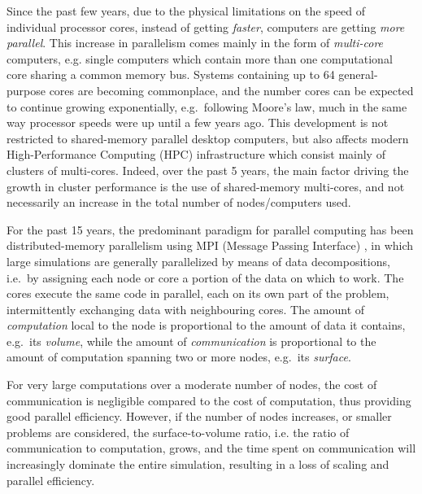 \documentclass[final]{siamltex}
\begin{document}
Since the past few years, due to the physical limitations
on the speed of individual processor cores, instead of
getting {\em faster}, computers are getting {\em more parallel}.
This increase in parallelism comes mainly in the form of
{\em multi-core} computers, e.g. single computers which
contain more than one computational core sharing a common 
memory bus.
Systems containing up to 64 general-purpose cores are becoming
commonplace, and the number cores can be expected to continue
growing exponentially, e.g.~following Moore's law, much in the
same way processor speeds were up until a few years ago.
This development is not restricted to shared-memory parallel desktop
computers, but also affects modern High-Performance Computing (HPC)
infrastructure which consist mainly of clusters of multi-cores.
Indeed, over the past 5 years, the main factor driving the growth
in cluster performance is the use of shared-memory multi-cores,
and not necessarily an increase in the total number of
nodes/computers used.

For the past 15 years, the predominant paradigm for parallel
computing has been distributed-memory parallelism using MPI
(Message Passing Interface) \cite{ref:Snir1998},
in which large simulations are generally
parallelized by means of data decompositions, i.e.~by assigning
each node or core a portion of the data on which to work.
The cores execute the same code
in parallel, each on its own part of the problem, intermittently exchanging
data with neighbouring cores.
The amount of {\em computation} local to the node is proportional
to the amount of data it contains, e.g.~its {\em volume}, while
the amount of {\em communication} is proportional to the
amount of computation spanning two or more nodes, e.g.~its
{\em surface}.

For very large computations over a moderate number of nodes,
the cost of communication is negligible compared to the
cost of computation, thus providing good parallel efficiency.
However, if the number of nodes increases, or 
smaller problems are considered, the surface-to-volume ratio,
i.e. the ratio of communication to computation,
grows, and the time spent on communication will increasingly
dominate the entire simulation, resulting in a loss of scaling
and parallel efficiency.

\end{document}
